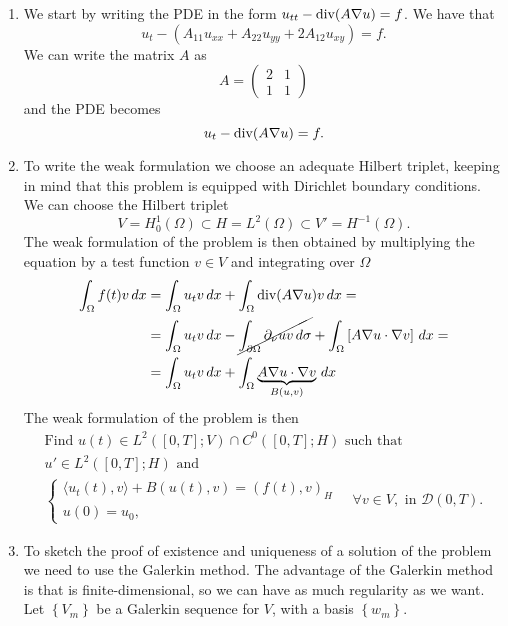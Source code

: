 \begin{enumerate}
    \item We start by writing the PDE in the form \(u_{tt} - \text{div}(A \nabla u) = f\). We have that
    \[
        u_{t} - \left(A_{11} u_{xx} + A_{22} u_{yy} + 2A_{12} u_{xy}\right) = f.
    \]
    We can write the matrix \(A\) as
    \[
        A = \begin{pmatrix}
            2 & 1 \\
            1 & 1
        \end{pmatrix}
    \]
    and the PDE becomes
    \[
        u_{t} - \text{div} (A \nabla u) = f.
    \]
    \item To write the weak formulation we choose an adequate Hilbert triplet, keeping in mind that this problem is equipped with Dirichlet boundary conditions. We can choose the Hilbert triplet
    \[
        V = H^1_0(\Omega) \subset H = L^2(\Omega) \subset V' = H^{-1}(\Omega).
    \]
    The weak formulation of the problem is then obtained by multiplying the equation by a test function \(v \in V\) and integrating over \(\Omega\)
    \begin{align*}
        \int_\Omega f(t) v \, dx &= \int_\Omega u_{t} v \, dx + \int_\Omega \text{div}(A \nabla u)v \, dx =\\
        &= \int_\Omega u_{t} v \, dx - \cancel{\int_{\partial\Omega} \partial_\nu u v \, d\sigma} + \int_\Omega \left[A \nabla u \cdot \nabla v\right] \, dx = \\
        &= \int_\Omega u_{t} v \, dx + \int_\Omega \underbrace{A \nabla u \cdot \nabla v}_{B(u, v)} \, dx
    \end{align*}
    The weak formulation of the problem is then
    \[
        \begin{split}
            \text{Find } u(t) \in L^2([0, T]; V)\cap C^0([0, T]; H)\text{ such that } \\
            u' \in L^2([0, T];H)\text{ and } \\
            \begin{cases}
                \langle u_{t}(t), v \rangle + B(u(t), v) = (f(t), v)_H \\
                u(0) = u_0,
            \end{cases}\quad \forall v \in V, \text{ in } \mathcal{D}(0, T).
        \end{split}
    \]
    \item To sketch the proof of existence and uniqueness of a solution of the problem we need to use the Galerkin method. The advantage of the Galerkin method is that is finite-dimensional, so we can have as much regularity as we want. Let \(\left\{V_m\right\}\) be a Galerkin sequence for \(V\), with a basis \(\left\{w_m \right\}\).

\end{enumerate}
